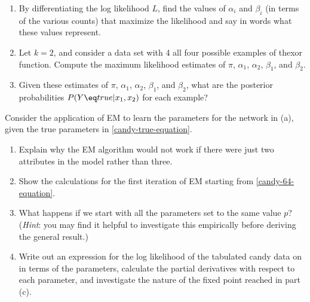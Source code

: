 \begin{uexercise}
\begin{enumerate}
\item By differentiating the log likelihood $L$, find the values of $\alpha_i$ and $\beta_i$
(in terms of the various counts) that maximize the likelihood and say in words what these values represent.

\item Let $k = 2$, and consider a data set with 4 all four possible examples of the{\sc xor} function.
Compute the maximum likelihood estimates of $\pi$, $\alpha_1$, $\alpha_2$, $\beta_1$, and $\beta_2$.

\item Given these estimates of $\pi$, $\alpha_1$, $\alpha_2$, $\beta_1$, and $\beta_2$,
what are the posterior probabilities $P(Y\eq true | x_1,x_2)$ for each example?


\end{enumerate}
\end{uexercise} 



\begin{exercise}
Consider the application of EM to learn the parameters for the network in 
(a), given the true parameters in \eqref{candy-true-equation}.
\begin{enumerate}
\item Explain why the EM algorithm would not work if there were just two attributes in the model
rather than three.
\item Show the calculations for the first iteration of EM starting from
\eqref{candy-64-equation}.
\item What happens if we start with all the parameters set to the same value \(p\)?
({\it Hint}: you may find it helpful to investigate this empirically
before deriving the general result.)
\item Write out an expression for the log likelihood of the tabulated candy data on  in terms of 
the parameters, calculate the partial derivatives with respect to each parameter, and investigate the nature
of the fixed point reached in part (c).
\end{enumerate}
\end{exercise} 

